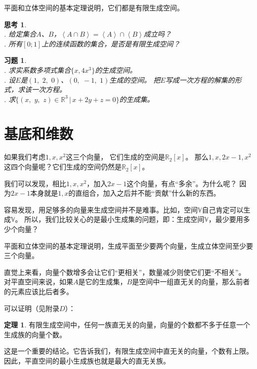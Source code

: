 \documentclass[12pt,UTF8]{ctexbook}
\newcommand{\vect}[1]{\left\langle #1 \right\rangle}
\theoremstyle{definition}
\newtheorem{tm}{定理}[section]
\theoremstyle{plain}
\newtheorem{sk}{思考}[section]
\newtheorem{xt}{习题}[section]
\begin{document}
平面和立体空间的基本定理说明，它们都是有限生成空间。

\begin{sk}
    \mbox{} \\
    . 给定集合$A$、$B$，$\vect{A\cap B} = \vect{A}\cap\vect{B}$成立吗？\\
    . 所有$[0;1]$上的连续函数的集合，是否是有限生成空间？
\end{sk}

\begin{xt}
    \mbox{} \\
    . 求实系数多项式集合$\{x, 4x^3\}$的生成空间。\\
    . 设$E$是$(1, \,\,2, \,\,0)$、$(0, \,\,-1, \,\,1)$生成的空间。
    把$E$写成一次方程的解集的形式，求该一次方程。\\
    . 求$\{(x,\,\,y,\,\,z)\in\mathbb{R}^3 \, | \, x + 2y + z = 0 \}$的生成集。
    
\end{xt}

\section{基底和维数}

如果我们考虑$1,x,x^2$这三个向量，
它们生成的空间是$\mathbb{R}_2[x]$。
那么$1,x,2x-1,x^2$这四个向量呢？它们生成的空间仍然是$\mathbb{R}_2[x]$。

我们可以发现，相比$1,x,x^2$，加入$2x-1$这个向量，有点“多余”。为什么呢？
因为$2x-1$本身就是$1, x$的直组合，加入之后并不能“贡献”什么新的东西。

容易发现，用足够多的向量来生成空间并不是难事。比如，空间$\mathbb{V}$自己肯定可以生成$\mathbb{V}$。
所以，我们比较关心的是最小生成集的问题，即：生成空间$\mathbb{V}$，最少要用多少个向量？

平面和立体空间的基本定理说明，生成平面至少要两个向量，生成立体空间至少要三个向量。

直觉上来看，向量个数增多会让它们“更相关”，数量减少则使它们更“不相关”。
对平直空间来说，如果$A$是它的生成集，$B$是空间中一组直无关的向量，那么前者的元素应该比后者多。

可以证明（见附录$D$）：
\begin{tm}\label{tm:4-3-10}
    有限生成空间中，任何一族直无关的向量，向量的个数都不多于任意一个生成族的向量个数。
\end{tm}
这是一个重要的结论。它告诉我们，有限生成空间中直无关的向量，个数有上限。
因此，平直空间的最小生成族也就是最大的直无关族。
\end{document}

